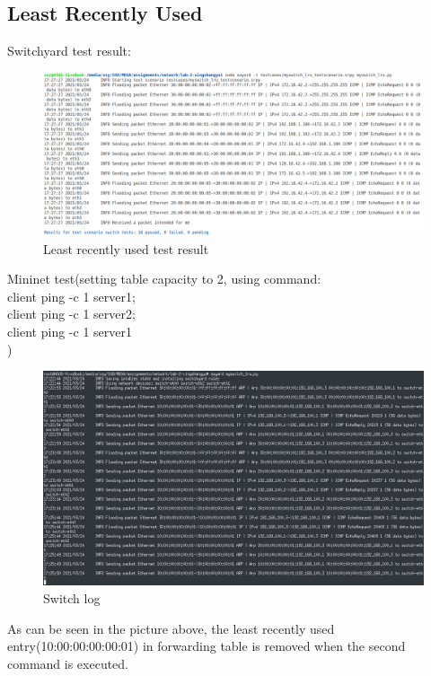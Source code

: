 \documentclass[12pt,a4paper,UTF8]{article}
\begin{document}
\subsection{Least Recently Used}
Switchyard test result:
\begin{figure}[htbp]
	\centering
	\includegraphics[width=\textwidth]{lru_test}
	\caption{Least recently used test result}
\end{figure}
\newpage
Mininet test(setting table capacity to 2, using command: \\ client ping -c 1 server1; \\ client ping -c 1 server2; \\ client ping -c 1 server1 \\ )
\begin{figure}[htbp]
	\centering
	\includegraphics[width=\textwidth]{lru_mininet}
	\caption{Switch log}
\end{figure}
\newpage
As can be seen in the picture above, the least recently used entry(10:00:00:00:00:01) in forwarding table is removed when the second command is executed.
\end{document}
